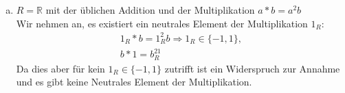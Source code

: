 \documentclass{article}
\newcommand{\R}{\mathbb{R}}
\begin{document}
\begin{enumerate}[(a)]
        Wir nehmen an
        \begin{align*}
            \underset{A\in R}\forall\underset{-A\in R}\exists -A+A=0_R\\
            \Rightarrow\underset{-M\in R}\exists -M+M=0_R\\
            \Rightarrow\underset{-M\in R}\exists -M\cup M=\emptyset\\
            \Rightarrow M=\emptyset
        \end{align*}
        Widerspruch zur Annahme $\Rightarrow$ Es existiert kein inverses Element der Addition.
    \item
        \color{blue}
        $R=\R$ mit der üblichen Addition und der Multiplikation $a*b=a^2b$\\
        \color{black}
        Wir nehmen an, es existiert ein neutrales Element der Multiplikation $1_R$:
        \begin{align*}
            1_R*b=1_R^2b\Rightarrow 1_R\in\{-1,1\},\\
            b*1=b^21_R
        \end{align*}
        Da dies aber für kein $1_R\in\{-1,1\}$ zutrifft ist ein Widerspruch zur Annahme
        und es gibt keine Neutrales Element der Multiplikation.
\end{enumerate}
\end{document}
